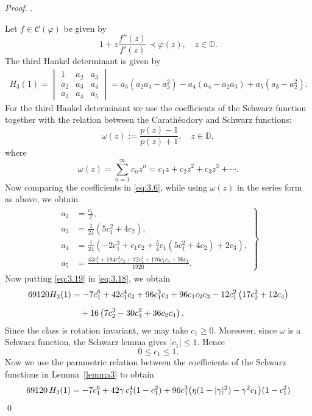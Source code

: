 \documentclass[a4paper,12pt,reqno]{amsart} %
\numberwithin{equation}{section}
\theoremstyle{definition}
\newenvironment{pf}[1][]{%
	\vskip 3mm
	\noindent
	\ifthenelse{\equal{#1}{}}%
	{{\slshape Proof. }}%
	{{\slshape #1.} }%
}%
{\qed\bigskip}
\begin{document}
\begin{pf}
Let $f\in \mathcal{C}(\varphi)$ be given by 
\[
1+z\frac{f''(z)}{f'(z)} \prec \varphi(z), \quad z\in \mathbb{D}.
\]
The third Hankel determinant is given  by
\begin{align}\label{eq:3.18}
H_3(1) =
\begin{vmatrix}
	1 & a_2 & a_3 \\
	a_2 & a_3 & a_4 \\
	a_3 & a_4 & a_5
\end{vmatrix}
= a_3(a_2 a_4 - a_3^2) - a_4(a_4 - a_2 a_3) + a_5(a_3 - a_2^2).
\end{align}
For the third Hankel determinant we use the coefficients of the Schwarz function together with the relation between the Carath\'eodory and Schwarz functions:
\[
\omega(z):=\frac{p(z)-1}{p(z)+1}, \quad z\in \mathbb{D},
\]
where
\[
\omega(z)=\sum_{n=1}^{\infty}c_n z^n
= c_1 z+c_2 z^2+c_3 z^3+\cdots.
\]
Now comparing the coefficients in \eqref{eq:3.6}, while using  $\omega(z)$ in the series form as above, we obtain
\begin{align}\label{eq:3.19}
\left.
\begin{aligned}
	a_{2} & = \frac{c_{1}}{2},\\[1mm]
	a_{3} & = \frac{1}{24}\left(5c_{1}^{2}+4c_{2}\right),\\[1mm]
	a_{4} & = \frac{1}{24}\left(-2c_{1}^{3}+c_{1}c_{2}+\frac{3}{4}c_{1}\left(5c_{1}^{2}+4c_{2}\right)+2c_{3}\right),\\[1mm]
	a_{5} & = \frac{43c_{1}^{4}+184c_{1}^{2}c_{2}+72c_{2}^{2}+176c_{1}c_{3}+96c_{4}}{1920}.
\end{aligned}
\right\}
\end{align}
Now putting \eqref{eq:3.19} in \eqref{eq:3.18}, we obtain
\begin{align}\label{eq:3.20}
69120 H_{3}(1)&=-7c_{1}^{6}+42c_{1}^{4}c_{2}+96c_{1}^{3}c_{3}+96c_{1}c_{2}c_{3}
-12c_{1}^{2}\left(17c_{2}^{2}+12c_{4}\right)\notag\\[2mm]
&\quad+16\left(7c_{2}^{3}-30c_{3}^{2}+36c_{2}c_{4}\right).
\end{align}
Since the class is rotation invariant, we may take $c_{1} \geq 0$. Moreover, since \(\omega\) is a Schwarz function, the Schwarz lemma gives \(|c_1|\le 1\). Hence
\[
0\le c_1\le 1.
\]
Now we use the parametric relation between the coefficients of the Schwarz functions in Lemma~\ref{lemma3} to obtain
\begin{align}
69120\,  H_{3}(1)&=-7c_{1}^{6}
+42\gamma\,c_{1}^{4}(1-c_{1}^{2})+96c_{1}^{3}\bigl(\eta(1-|\gamma|^{2})-\gamma^{2}c_{1}\bigr)(1-c_{1}^{2})\notag\\

\end{align}
\end{pf}
\end{document}

